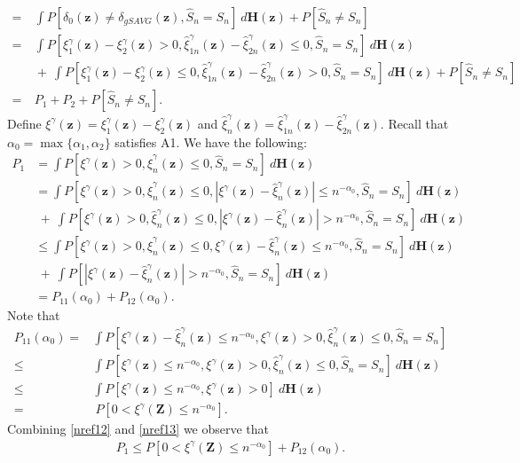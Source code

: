 \documentclass[twoside]{article}
\newcommand{\bZ}{\mathbf{Z}}
\newcommand{\bH}{\mathbf{H}}
\newcommand{\bz}{\mathbf{z}}
\newcommand{\0}{\mathbf{0}}
\newcommand{\1}{\mathbf{1}}
\numberwithin{equation}{section}
\begin{document}
\begin{align}
    = &\ \int P[\delta_{0}(\bz)\neq \delta_{gSAVG}(\bz), \hat{S}_n=S_n]\ d\bH(\bz) +P[\hat{S}_n\neq S_n]\nonumber\\
    = &\ \int P[\xi^\gamma_1(\bz)-\xi^\gamma_2(\bz)>0,\hat{\xi}^\gamma_{1n}(\bz)-\hat{\xi}^\gamma_{2n}(\bz)\leq 0, \hat{S}_n=S_n]\ d\bH(\bz)\nonumber\\
    &\ +\ \int P[\xi^\gamma_1(\bz)-\xi^\gamma_2(\bz)\leq 0,\hat{\xi}^\gamma_{1n}(\bz)-\hat{\xi}^\gamma_{2n}(\bz)> 0, \hat{S}_n=S_n]\ d\bH(\bz)+P[\hat{S}_n\neq S_n]\nonumber\\
    =&\ P_1 + P_2 + P[\hat{S}_n\neq S_n].
\end{align}
Define $\xi^\gamma(\bz) = \xi^\gamma_1(\bz)-\xi^\gamma_2(\bz)$ and $\hat{\xi}^\gamma_{n}(\bz) = \hat{\xi}^\gamma_{1n}(\bz)-\hat{\xi}^\gamma_{2n}(\bz)$. Recall that $\alpha_0=\max\{\alpha_1,\alpha_2\}$ satisfies A1. We have the following:
\begin{align}\label{nref12}
    P_1 &= \int P[\xi^\gamma(\bz)>0,\hat{\xi}^\gamma_{n}(\bz)\leq 0, \hat{S}_n=S_n]\ d\bH(\bz)\nonumber\\
    &= \int P[\xi^\gamma(\bz)>0,\hat{\xi}^\gamma_{n}(\bz)\leq 0, |\xi^\gamma(\bz)-\hat{\xi}^\gamma_{n}(\bz)|\leq n^{-\alpha_0}, \hat{S}_n=S_n]\ d\bH(\bz)\nonumber\\
    &\ +\ \int P[\xi^\gamma(\bz)>0,\hat{\xi}^\gamma_{n}(\bz)\leq 0, |\xi^\gamma(\bz)-\hat{\xi}^\gamma_{n}(\bz)|> n^{-\alpha_0}, \hat{S}_n=S_n]\ d\bH(\bz)\nonumber\\
    &\leq \int P[\xi^\gamma(\bz)>0,\hat{\xi}^\gamma_{n}(\bz)\leq 0, \xi^\gamma(\bz)-\hat{\xi}^\gamma_{n}(\bz)\leq n^{-\alpha_0}, \hat{S}_n=S_n]\ d\bH(\bz)\nonumber\\
    &\ +\ \int P[|\xi^\gamma(\bz)-\hat{\xi}^\gamma_{n}(\bz)|> n^{-\alpha_0}, \hat{S}_n=S_n]\ d\bH(\bz)\nonumber\\
    &= P_{11}(\alpha_0) + P_{12}(\alpha_0).
\end{align}
Note that 
\begin{align}\label{nref13}
    P_{11}(\alpha_0) =& \int P[\xi^\gamma(\bz)-\hat{\xi}^\gamma_{n}(\bz)\leq n^{-\alpha_0}, \xi^\gamma(\bz)>0,\hat{\xi}^\gamma_{n}(\bz)\leq 0, \hat{S}_n=S_n]\nonumber\\
    \leq & \int P[\xi^\gamma(\bz)\leq n^{-\alpha_0}, \xi^\gamma(\bz)>0,\hat{\xi}^\gamma_{n}(\bz)\leq 0, \hat{S}_n=S_n]\ d\bH(\bz)\nonumber\\
    \leq & \int P[\xi^\gamma(\bz)\leq n^{-\alpha_0}, \xi^\gamma(\bz)>0]\ d\bH(\bz)\nonumber\\
     = &\ P[0<\xi^\gamma(\bZ)\leq n^{-\alpha_0}].
\end{align}
Combining \eqref{nref12} and \eqref{nref13} we observe that 
\begin{align}\label{nrefP1}
    P_1 \leq P[0<\xi^\gamma(\bZ)\leq n^{-\alpha_0}] + P_{12}(\alpha_0).
\end{align}
\end{document}
